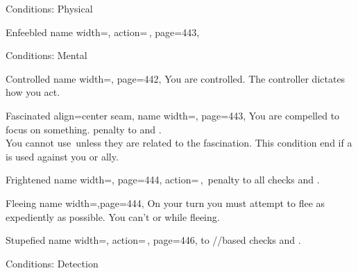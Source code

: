 \begin{PageFrontLandscape}
\begin{TablesHalf}{\frontTableHeight}
\begin{Table}{Conditions: Physical}
\begin{entry}{Enfeebled}{%
                name width=\conditionLength,%
                action=\,\X,
                page=443,
            }
            \end{entry}
        \end{Table}
        \TableSpace
        \begin{Table}{Conditions: Mental}
            \begin{entry}{Controlled}{%
                name width=\conditionLength,%
                page=442,
            }
                You are controlled. The controller dictates how you act.\hfill
            \end{entry}
            \begin{entry}{Fascinated}{%
                align=center seam,
                name width=\conditionLength,
                page=443,
            }
                You are compelled to focus on something.  \Cirm penalty to \PerceptionT and .\\
                You cannot use \Concentrate\,unless they are related to the fascination. \hfill
                This condition end if a  is used against you or ally.
            \end{entry}
            \begin{entry}{Frightened}{%
                name width=\conditionLength,%
                page=444,
                action=\,\X,
            }
                \Numb{-\X}\,\Cirm penalty to all checks and \DCs. \hfill
            \end{entry}
            \begin{entry}{Fleeing}{%
                name width=\conditionLength,page=444,
            }
                On your turn you must attempt to flee as expediently as possible. \hfill
                You can't  or  while fleeing.
            \end{entry}
            \begin{entry}{Stupefied}{%
                name width=\conditionLength,%
                action=\,\X,
                page=446,
            }
                \Numb{-\X} \Status to \Intellegence\!/\Wisdom\!/\Charisma based checks and \DCs. \hfill
                 \Flat[][val=5+\X] 
            \end{entry}
        \end{Table}
        \TableSpace
        \begin{Table}{Conditions: Detection}

\end{Table}
\end{TablesHalf}
\end{PageFrontLandscape}
